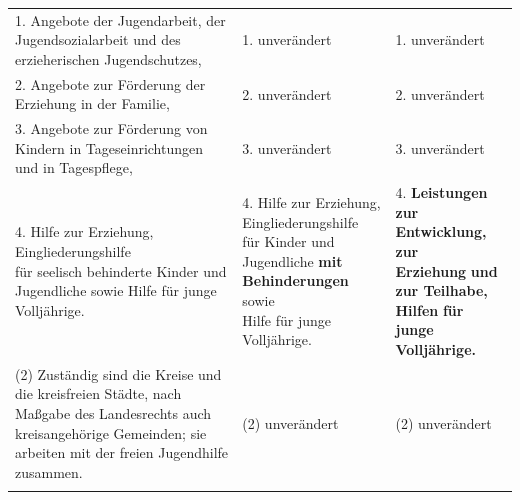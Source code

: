 \documentclass[10pt,a4paper,landscape]{article}
\begin{document}
\begin{longtable}{|L{8.2cm}|L{8.2cm}|L{8.2cm}|}
\hhline{|---|}
1.   \newline Angebote der Jugendarbeit, der  \newline Jugendsozialarbeit und des erzieherischen  \newline Jugendschutzes, & 1. unverändert & 1. unverändert \\
\hhline{|---|}
2.   \newline Angebote zur Förderung der Erziehung in  \newline der Familie, & 2. unverändert & 2. unverändert \\
\hhline{|---|}
3. Angebote zur Förderung von Kindern in  \newline Tageseinrichtungen und in Tagespflege, & 3. unverändert & 3. unverändert \\
\hhline{|---|}
4. \textcolor{diffred}{Hilfe} zur \textcolor{diffred}{Erziehung, Eingliederungshilfe  \newline für seelisch behinderte Kinder} und  \newline \textcolor{diffred}{Jugendliche sowie Hilfe} für junge  \newline Volljährige. & 4. \textcolor{diffred}{Hilfe} zur \textcolor{diffred}{Erziehung, Eingliederungshilfe  \newline für  Kinder} und  \newline \textcolor{diffred}{Jugendliche }\textbf{\textcolor{diffred}{mit Behinderungen}}\textcolor{diffred}{ sowie  \newline Hilfe} für junge Volljährige. & 4. \textbf{\textcolor{diffgreen}{Leistungen}}\textbf{ zur }\textbf{\textcolor{diffgreen}{Entwicklung, zur  \newline Erziehung}}\textbf{ und }\textbf{\textcolor{diffgreen}{zur Teilhabe, Hilfen}}\textbf{ für  \newline junge Volljährige.} \\
\hhline{|---|}
(2) Zuständig sind die Kreise und die  \newline kreisfreien Städte, nach Maßgabe des  \newline Landesrechts auch kreisangehörige  \newline Gemeinden; sie arbeiten mit der freien  \newline Jugendhilfe zusammen. & (2) unverändert & (2) unverändert \\
\hhline{|---|}
\end{longtable}
\newpage
\end{document}
